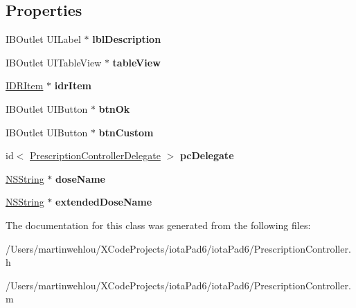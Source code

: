 \subsection*{Properties}
\begin{DoxyCompactItemize}
\item 
\hypertarget{interface_prescription_controller_aee866cb0052cb72a0600592f643e7b61}{
IBOutlet UILabel $\ast$ {\bfseries lblDescription}}
\label{interface_prescription_controller_aee866cb0052cb72a0600592f643e7b61}

\item 
\hypertarget{interface_prescription_controller_a26569cffaf07e8d2df145fddf281969f}{
IBOutlet UITableView $\ast$ {\bfseries tableView}}
\label{interface_prescription_controller_a26569cffaf07e8d2df145fddf281969f}

\item 
\hypertarget{interface_prescription_controller_a6196c7b0806740563340afa6908c9a88}{
\hyperlink{interface_i_d_r_item}{IDRItem} $\ast$ {\bfseries idrItem}}
\label{interface_prescription_controller_a6196c7b0806740563340afa6908c9a88}

\item 
\hypertarget{interface_prescription_controller_af32a438fa4fb295a00b7b0e6ad993945}{
IBOutlet UIButton $\ast$ {\bfseries btnOk}}
\label{interface_prescription_controller_af32a438fa4fb295a00b7b0e6ad993945}

\item 
\hypertarget{interface_prescription_controller_a1b52b38004dec14c6743e20c1c05d06f}{
IBOutlet UIButton $\ast$ {\bfseries btnCustom}}
\label{interface_prescription_controller_a1b52b38004dec14c6743e20c1c05d06f}

\item 
\hypertarget{interface_prescription_controller_ab39763c89f208aa4891554717f22b8b9}{
id$<$ \hyperlink{protocol_prescription_controller_delegate-p}{PrescriptionControllerDelegate} $>$ {\bfseries pcDelegate}}
\label{interface_prescription_controller_ab39763c89f208aa4891554717f22b8b9}

\item 
\hypertarget{interface_prescription_controller_a827a89127c47303724b197c687babb3d}{
\hyperlink{class_n_s_string}{NSString} $\ast$ {\bfseries doseName}}
\label{interface_prescription_controller_a827a89127c47303724b197c687babb3d}

\item 
\hypertarget{interface_prescription_controller_aeef73f891db43218d67f303bb2585376}{
\hyperlink{class_n_s_string}{NSString} $\ast$ {\bfseries extendedDoseName}}
\label{interface_prescription_controller_aeef73f891db43218d67f303bb2585376}

\end{DoxyCompactItemize}


The documentation for this class was generated from the following files:\begin{DoxyCompactItemize}
\item 
/Users/martinwehlou/XCodeProjects/iotaPad6/iotaPad6/PrescriptionController.h\item 
/Users/martinwehlou/XCodeProjects/iotaPad6/iotaPad6/PrescriptionController.m\end{DoxyCompactItemize}
